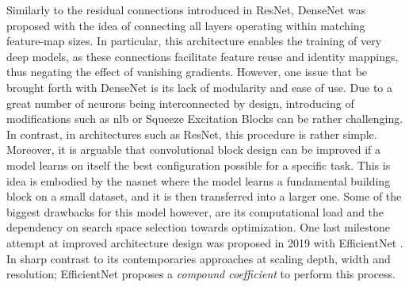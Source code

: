 \noindent Similarly to the residual connections introduced in ResNet, DenseNet 
\autocite{huang2017densely} was proposed with the idea of connecting all layers operating within 
matching feature-map sizes. In particular, this architecture enables the training of very deep 
models, as these connections facilitate feature reuse and identity mappings, thus negating the 
effect of vanishing gradients. However, one issue that be brought forth with DenseNet is its 
lack of  modularity and ease of use. Due to a great number of neurons being interconnected by 
design, introducing of modifications such as \gls{nlb}\autocite{wang2018non} or Squeeze Excitation 
Blocks  \autocite{hu2018squeeze} can be  rather challenging. In contrast, in architectures such as 
ResNet, this procedure is rather simple.\\

\noindent Moreover, it is arguable that convolutional block design can be improved if a model 
learns on itself the best configuration possible for a specific task. This is idea is embodied by 
the \gls{nasnet} \autocite{zoph2018learning} where the model learns a fundamental building block on a 
small dataset, and it is then transferred into a larger one. Some of the biggest drawbacks for this 
model however, are its computational load and the dependency on search space selection towards 
optimization. One last milestone attempt at improved architecture design was proposed in 2019 with 
EfficientNet \autocite{tan2019efficientnet}. In sharp contrast to its contemporaries approaches at 
scaling depth, width and resolution; EfficientNet proposes a \emph{compound coefficient} to 
perform this process.\\

